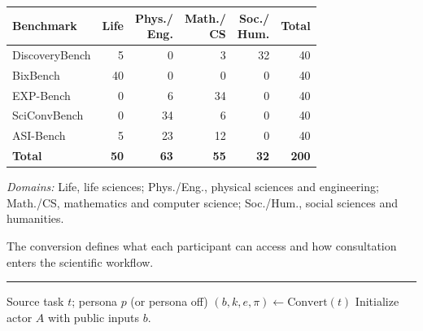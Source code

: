 \begin{minipage}{\linewidth}
  \begin{minipage}[t]{0.45\linewidth}
    \vspace{0pt}
    \captionsetup{justification=raggedright,singlelinecheck=false,hypcap=false}
    \begingroup
    \footnotesize
    \setlength{\tabcolsep}{3pt}
    \renewcommand{\arraystretch}{1.15}
    \begin{tabular*}{\linewidth}{@{\extracolsep{\fill}}lrrrrr@{}}
      \toprule
      Benchmark & Life & \shortstack{Phys./\\Eng.}
        & \shortstack{Math./\\CS} & \shortstack{Soc./\\Hum.} & Total \\
      \midrule
      DiscoveryBench & 5 & 0 & 3 & 32 & 40 \\
      BixBench & 40 & 0 & 0 & 0 & 40 \\
      EXP-Bench & 0 & 6 & 34 & 0 & 40 \\
      SciConvBench & 0 & 34 & 6 & 0 & 40 \\
      ASI-Bench & 5 & 23 & 12 & 0 & 40 \\
      \midrule
      \textbf{Total} & \textbf{50} & \textbf{63} & \textbf{55} & \textbf{32} & \textbf{200} \\
      \bottomrule
    \end{tabular*}
    \par\smallskip
    \raggedright
    \textit{Domains:} Life, life sciences; Phys./Eng., physical sciences
    and engineering; Math./CS, mathematics and computer science;
    Soc./Hum., social sciences and humanities.
    \par\endgroup
    \label{tab:dataset-construction}
    \medskip\noindent
    The conversion defines what each participant can access and how
    consultation enters the scientific workflow.
    \par
  \end{minipage}\hfill
  \begin{minipage}[t]{0.52\linewidth}
    \vspace{0pt}
    \captionsetup{justification=raggedright,singlelinecheck=false,hypcap=false}
    \footnotesize
    \hrule\smallskip
    \begin{algorithmic}[1]
      \REQUIRE Source task $t$; persona $p$ (or persona off)
      \STATE $(b,k,e,\pi) \gets \mathrm{Convert}(t)$
      \STATE Initialize actor $A$ with public inputs $b$.

\end{algorithmic}
\end{minipage}
\end{minipage}
